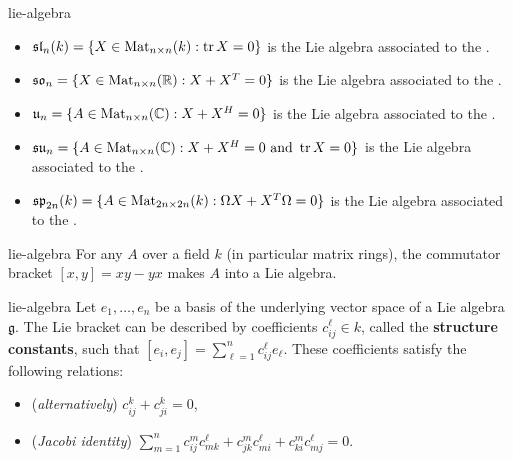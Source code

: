 \begin{example}{lie-algebra}
    \begin{itemize}
        \item $\mathfrak{sl}_n(k) = \{ X \in \textup{Mat}_{n \times n}(k) : \operatorname{tr} X = 0 \}$ is the Lie algebra associated to the .
        \item $\mathfrak{so}_n = \{ X \in \textup{Mat}_{n \times n}(\mathbb{R}) : X + X^T = 0 \}$ is the Lie algebra associated to the .
        \item $\mathfrak{u}_n = \{ A \in \textup{Mat}_{n \times n}(\mathbb{C}) : X + X^H = 0 \}$ is the Lie algebra associated to the .
        \item $\mathfrak{su}_n = \{ A \in \textup{Mat}_{n \times n}(\mathbb{C}) : X + X^H = 0 \textup{ and } \operatorname{tr} X = 0 \}$ is the Lie algebra associated to the .
        \item $\mathfrak{sp}_{2n}(k) = \{ A \in \textup{Mat}_{2n \times 2n}(k) : \Omega X + X^T \Omega = 0 \}$ is the Lie algebra associated to the .
    \end{itemize}
\end{example}

\begin{example}{lie-algebra}
    For any  $A$ over a field $k$ (in particular matrix rings), the commutator bracket $[x, y] = xy - yx$ makes $A$ into a Lie algebra.
\end{example}

\begin{example}{lie-algebra}
    Let $e_1, \ldots, e_n$ be a basis of the underlying vector space of a Lie algebra $\mathfrak{g}$. The Lie bracket can be described by coefficients $c_{ij}^\ell \in k$, called the \textbf{structure constants}, such that $[e_i, e_j] = \sum_{\ell = 1}^{n} c_{ij}^\ell e_\ell$. These coefficients satisfy the following relations:
    \begin{itemize}
        \item (\textit{alternatively}) $c_{ij}^k + c_{ji}^k = 0$,
        \item (\textit{Jacobi identity}) $\sum_{m = 1}^{n} c_{ij}^m c_{m k}^\ell + c_{j k}^m c_{m i}^\ell + c_{k i}^m c_{m j}^\ell = 0$.
    \end{itemize}
\end{example}


